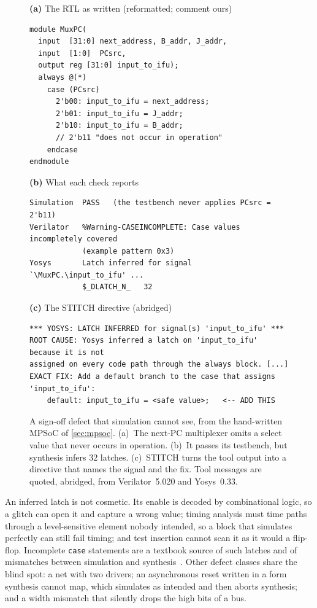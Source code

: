 \documentclass[11pt]{article}
\begin{document}
\begin{figure}[!t]
\centering
\begin{minipage}[t]{0.40\linewidth}
\textsf{\footnotesize\textbf{(a)} The RTL as written (reformatted; comment ours)}
\begin{lstlisting}[style=rtl]
module MuxPC(
  input  [31:0] next_address, B_addr, J_addr,
  input  [1:0]  PCsrc,
  output reg [31:0] input_to_ifu);
  always @(*)
    case (PCsrc)
      2'b00: input_to_ifu = next_address;
      2'b01: input_to_ifu = J_addr;
      2'b10: input_to_ifu = B_addr;
      // 2'b11 "does not occur in operation"
    endcase
endmodule
\end{lstlisting}
\end{minipage}\hfill
\begin{minipage}[t]{0.575\linewidth}
\textsf{\footnotesize\textbf{(b)} What each check reports}
\begin{lstlisting}[style=log]
Simulation  PASS   (the testbench never applies PCsrc = 2'b11)
Verilator   %Warning-CASEINCOMPLETE: Case values incompletely covered
            (example pattern 0x3)
Yosys       Latch inferred for signal `\MuxPC.\input_to_ifu' ...
            $_DLATCH_N_   32
\end{lstlisting}
\vspace{3pt}
\textsf{\footnotesize\textbf{(c)} The STITCH directive (abridged)}
\begin{lstlisting}[style=log]
*** YOSYS: LATCH INFERRED for signal(s) 'input_to_ifu' ***
ROOT CAUSE: Yosys inferred a latch on 'input_to_ifu' because it is not
assigned on every code path through the always block. [...]
EXACT FIX: Add a default branch to the case that assigns 'input_to_ifu':
    default: input_to_ifu = <safe value>;   <-- ADD THIS
\end{lstlisting}
\end{minipage}
\caption{A sign-off defect that simulation cannot see, from the hand-written
MPSoC of \cref{sec:mpsoc}. (a)~The next-PC multiplexer omits a select value
that never occurs in operation. (b)~It passes its testbench, but synthesis
infers $32$ latches. (c)~STITCH turns the tool output into a directive that
names the signal and the fix. Tool messages are quoted, abridged, from
Verilator~5.020 and Yosys~0.33.}
\label{fig:motivation}
\end{figure}

An inferred latch is not cosmetic. Its enable is decoded by combinational
logic, so a glitch can open it and capture a wrong value; timing analysis must
time paths through a level-sensitive element nobody intended, so a block that
simulates perfectly can still fail timing; and test insertion cannot scan it as
it would a flip-flop. Incomplete \texttt{case} statements are a textbook source
of such latches and of mismatches between simulation and
synthesis~\cite{cummings1999}. Other defect classes share the blind spot: a net
with two drivers; an asynchronous reset written in a form synthesis cannot map,
which simulates as intended and then aborts synthesis; and a width mismatch
that silently drops the high bits of a bus.
\end{document}
